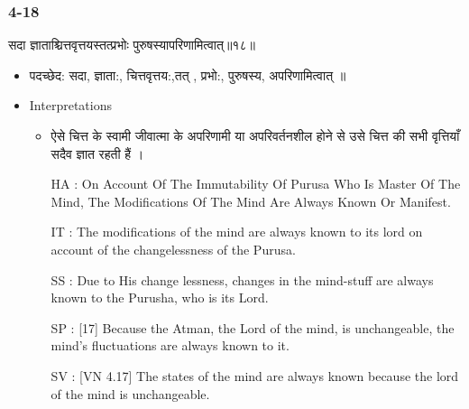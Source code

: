 \begin{frame}[fragile]\frametitle{4-18}
\begin{sanskrit}
सदा ज्ञाताश्चित्तवृत्तयस्तत्प्रभोः पुरुषस्यापरिणामित्वात्॥१८॥
\end{sanskrit}

	\begin{itemize}
	\item पदच्छेद: सदा, ज्ञाता:, चित्तवृत्तय:,तत् , प्रभो:, पुरुषस्य, अपरिणामित्वात् ॥
	\item Interpretations
		\begin{itemize}	
		\item ऐसे चित्त के स्वामी जीवात्मा के अपरिणामी या अपरिवर्तनशील होने से उसे चित्त की सभी वृत्तियाँ सदैव ज्ञात रहती हैं ।
		\item [HA]: On Account Of The Immutability Of Purusa Who Is Master Of The Mind, The Modifications Of The Mind Are Always Known Or Manifest.
		\item [IT]: The modifications of the mind are always known to its lord on account of the changelessness of the Purusa.
		\item [SS]: Due to His change lessness, changes in the mind-stuff are always known to the Purusha, who is its Lord.
		\item [SP]: [17] Because the Atman, the Lord of the mind, is unchangeable, the mind’s fluctuations are always known to it.
		\item [SV]: [VN 4.17] The states of the mind are always known because the lord of the mind is unchangeable.
		\end{itemize}
	\end{itemize}
\end{frame}



